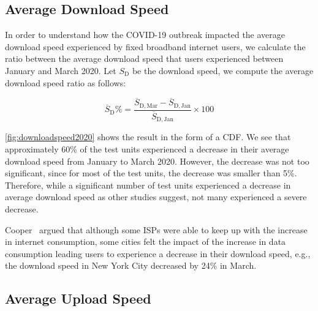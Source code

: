 \documentclass[conference,10pt]{IEEEtran}
\begin{document}
\subsection{Average Download Speed}\label{sec:average-download-speed}

In order to understand how the COVID-19 outbreak impacted the average download speed experienced by fixed broadband internet users, we calculate the ratio between the average download speed that users experienced between January and March 2020. Let $S_{\text{D}}$ be the download speed, we compute the average download speed ratio as follows:

\begin{equation}
\overline{S}_{\text{D}}\% = \frac{\overline{S}_{\text{D},\, \text{Mar}}-\overline{S}_{\text{D},\, \text{Jan}}}{\overline{S}_{\text{D},\, \text{Jan}}}\times 100
\end{equation}


\cref{fig:downloadspeed2020} shows the result in the form of a \gls{CDF}. We see that approximately 60\% of the test units experienced a decrease in their average download speed from January to March 2020. However, the decrease was not too significant, since for most of the test units, the decrease was smaller than 5\%. Therefore, while a significant number of test units experienced a decrease in average download speed as other studies suggest, not many experienced a severe decrease.

Cooper~\cite{cooper} argued that although some \glspl{ISP} were able to keep up with the increase in internet consumption, some cities felt the impact of the increase in data consumption leading users to experience a decrease in their download speed, e.g., the download speed in New York City decreased by 24\% in March.


\subsection{Average Upload Speed}\label{sec:average-upload-speed}
\end{document}
